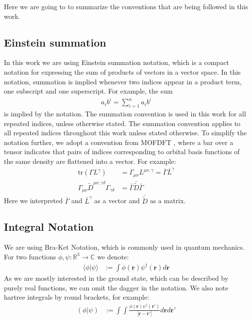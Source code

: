 Here we are going to to summarize the conventions that are being followed in this work.
\subsection{Einstein summation}
In this work we are using Einstein summation notation, which is a compact notation for expressing the sum of products of vectors in a vector space. In this notation, summation is implied whenever two indices appear in a product term, one subscript and one superscript. For example, the sum
\begin{align}
    a_i b^i = \sum_{i=1}^n a_i b^i
\end{align}
is implied by the notation. The summation convention is used in this work for all repeated indices, unless otherwise stated.
The summation convention applies to all repeated indices throughout this work unless stated otherwise. To simplify the notation further, we adopt a convention from MOFDFT \cite{zhang_m-ofdft_2023}, where a bar over a tensor indicates that pairs of indices corresponding to orbital basis functions of the same density are flattened into a vector. For example:
\begin{align}
    \text{tr}(\Gamma L^{\gamma})&=\Gamma_{\mu\nu}L^{\mu\nu,\gamma} = \bar\Gamma\bar L^{\gamma}\\
    \Gamma_{\mu\nu}\tilde D^{\mu\nu,\gamma\delta}\Gamma_{\gamma\delta} &= \bar\Gamma\bar {\tilde  D}\bar\Gamma
\end{align}
Here we interpreted $\bar\Gamma$ and $\bar L^{\gamma}$ as a vector and $\bar{\tilde D}$ as a matrix.
\subsection{Integral Notation}\label{integral_notation}
We are using Bra-Ket Notation, which is commonly used in quantum mechanics. For two functions $\phi,\psi:\mathbb{R}^3\rightarrow \mathbb{C}$ we denote:
\begin{align}
    \langle \phi | \psi\rangle &:= \int \phi(\mathbf r)\psi^\dagger(\mathbf r) d\mathbf r
\end{align}
As we are mostly interested in the ground state, which can be described by purely real functions, we can omit the dagger in the notation.
We also note hartree integrals by round brackets, for example:
\begin{align}
    (\phi | \psi) &:= \int \int \frac{\phi(\mathbf r)\psi^\dagger(\mathbf r')}{|\mathbf{r}-\mathbf{r'}|} d\mathbf rd\mathbf {r'}
\end{align}
